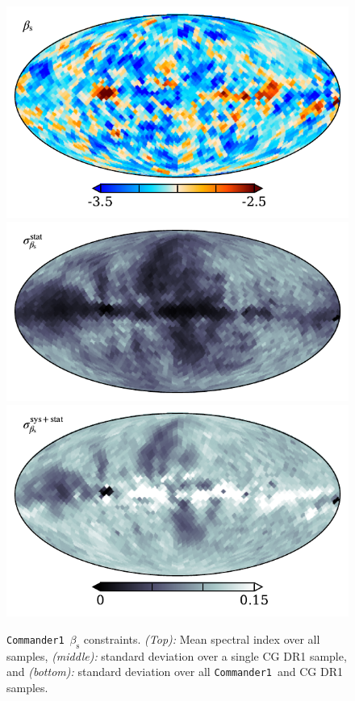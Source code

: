 \documentclass[twocolumn]{../../common/aa}
\def\commanderone{\texttt{Commander1}}
\begin{document}
\begin{figure}
	\centering
	\includegraphics[width=\columnwidth]{figures/beta_n0016_mu.pdf}\\
	\includegraphics[width=\columnwidth]{figures/beta_n0016_sd_samp.pdf}\\
	\includegraphics[width=\columnwidth]{figures/beta_n0016_sd_tot.pdf}
	\caption{
		\commanderone\ $\beta_\mathrm s$ constraints. \textit{(Top):} Mean spectral index over all samples, \textit{(middle):} standard deviation over a single CG DR1 sample, and \textit{(bottom):} standard deviation over all \commanderone\ and CG DR1 samples.}
	\label{fig:beta_16}
\end{figure}
\end{document}
